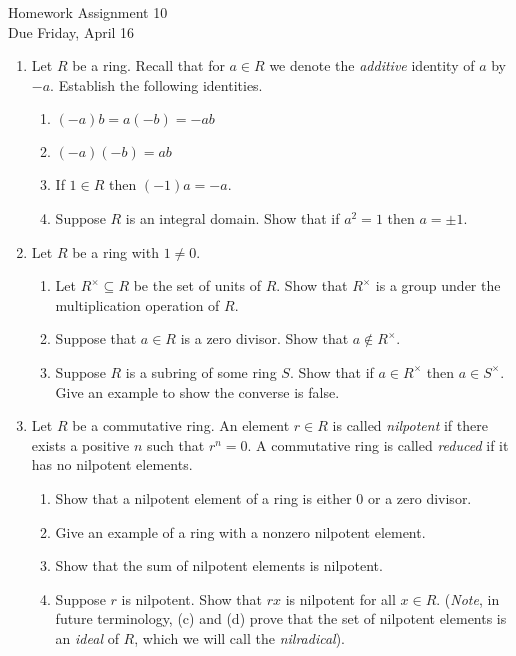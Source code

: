 \documentclass[11pt]{article}
\begin{document}
\begin{center}
  \Large {Homework Assignment 10}\\
  \small {Due Friday, April 16}
\end{center}
\begin{enumerate}
  \item{
  Let $R$ be a ring.  Recall that for $a\in R$ we denote the \textit{additive} identity of $a$ by $-a$.  Establish the following identities.
  \begin{enumerate}
    \item{$(-a)b = a(-b) = -ab$}
    \item{$(-a)(-b) = ab$}
    \item{If $1\in R$ then $(-1)a = -a$.}
    \item{Suppose $R$ is an integral domain.  Show that if $a^2=1$ then $a=\pm1$.}
  \end{enumerate}
  }
  \item{
  Let $R$ be a ring with $1\not=0$.
  \begin{enumerate}
    \item{
    Let $R^\times\subseteq R$ be the set of units of $R$.  Show that $R^\times$ is a group under the multiplication operation of $R$.
    }
    \item{
    Suppose that $a\in R$ is a zero divisor.  Show that $a\notin R^\times$.
    }
    \item{
    Suppose $R$ is a subring of some ring $S$.  Show that if $a\in R^\times$ then $a\in S^\times$.  Give an example to show the converse is false.
    }
  \end{enumerate}
  }
  \item{
  Let $R$ be a commutative ring.  An element $r\in R$ is called \textit{nilpotent} if there exists a positive $n$ such that $r^n=0$.  A commutative ring is called \textit{reduced} if it has no nilpotent elements.
  \begin{enumerate}
    \item{
    Show that a nilpotent element of a ring is either 0 or a zero divisor.
    }
    \item{
    Give an example of a ring with a nonzero nilpotent element.
    }
    \item{
    Show that the sum of nilpotent elements is nilpotent.
    }
    \item{
    Suppose $r$ is nilpotent.  Show that $rx$ is nilpotent for all $x\in R$.  (\textit{Note}, in future terminology, (c) and (d) prove that the set of nilpotent elements is an \textit{ideal} of $R$, which we will call the \textit{nilradical}).
}
\end{enumerate}}
\end{enumerate}
\end{document}
